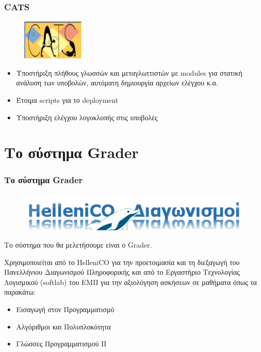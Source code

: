 \documentclass{beamer}
\begin{document}
\begin{frame}
  \frametitle{CATS}

  \begin{figure}
    \includegraphics[scale=0.7]{../Figures/cats.png}
  \end{figure}

  \begin{itemize}
      \item Υποστήριξη πλήθους γλωσσών και μεταγλωττιστών με modules για στατική
        ανάλυση των υποβολών, αυτόματη δημιουργία αρχείων ελέγχου κ.α.
      \item Έτοιμα scripts για το deployment
      \item Υποστήριξη ελέγχου λογοκλοπής στις υποβολές
  \end{itemize}
\end{frame}

\section{Το σύστημα Grader}
\begin{frame}
  \frametitle{Το σύστημα Grader}

  \begin{figure}
    \includegraphics[scale=0.5]{../Figures/hellenicologo4.png}
  \end{figure}

  Το σύστημα που θα μελετήσουμε είναι ο Grader. \\

  \bigskip

  Χρησιμοποιείται από το HelleniCO για την προετοιμασία και τη διεξαγωγή του
  Πανελλήνιου Διαγωνισμού Πληροφορικής και από το Εργαστήριο Τεχνολογίας
  Λογισμικού (softlab) του ΕΜΠ για την αξιολόγηση ασκήσεων σε μαθήματα όπως τα
  παρακάτω:

  \begin{itemize}
      \item Εισαγωγή στον Προγραμματισμό
      \item Αλγόριθμοι και Πολυπλοκότητα
      \item Γλώσσες Προγραμματισμού ΙΙ
  \end{itemize}
\end{frame}
\end{document}
